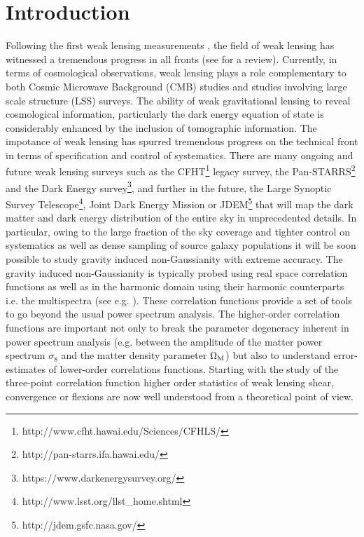 \documentclass[usenatbib]{mn2e}
\begin{document}
\section{Introduction}
%
Following the first weak lensing measurements \citep{BRE00,Wittman00,KWL00,Waerbeke00} ,
the field of weak lensing has witnessed a tremendous progress in all fronts (see \citet{MuPhysRep08} for a review).
Currently, in terms of cosmological observations, weak lensing plays a role complementary to both Cosmic Microwave 
Background (CMB) studies and studies involving large scale structure (LSS) surveys.
The ability of weak gravitational lensing to reveal cosmological information, particularly the dark energy equation
of state is considerably enhanced by the inclusion of tomographic information.
The impotance of weak lensing has spurred tremendous progress on the technical front in terms of specification
and control of systematics. There are many ongoing and future weak lensing surveys such as the 
CFHT{\footnote{http://www.cfht.hawai.edu/Sciences/CFHLS/}}
legacy survey, the Pan-STARRS{\footnote{http://pan-starrs.ifa.hawai.edu/}} 
and the Dark Energy survey{\footnote{https://www.darkenergysurvey.org/}},
and further in the future, the Large Synoptic Survey Telescope{\footnote{http://www.lsst.org/llst\_home.shtml}},
Joint Dark Energy Mission or JDEM{\footnote{http://jdem.gsfc.nasa.gov/}} that will map the dark matter and dark energy distribution
of the entire sky in unprecedented details. In particular, owing to the large fraction of the sky coverage
and tighter control on systematics as well as dense sampling of source galaxy populations it will be
soon possible to study gravity induced non-Gaussianity with extreme accuracy.
The gravity induced non-Gaussianity is typically probed using real space correlation
functions as well as in the harmonic domain using their harmonic counterparts i.e.
the multispectra (see e.g. \cite{Pen03}). These correlation functions provide 
a set of tools to go beyond the usual power spectrum analysis. The higher-order correlation functions
are important not only to break the parameter degeneracy  inherent in power spectrum analysis
(e.g. between the amplitude of the matter power spectrum $\sigma_8$ and the matter density parameter $\Omega_{\rm M}$)
but also to understand error-estimates of lower-order correlations functions.
Starting with the study of the three-point correlation function \citep{Vil96,JainSeljak97}
higher order statistics of weak lensing shear, convergence or flexions are now well understood
from a theoretical point of view.
\end{document}
